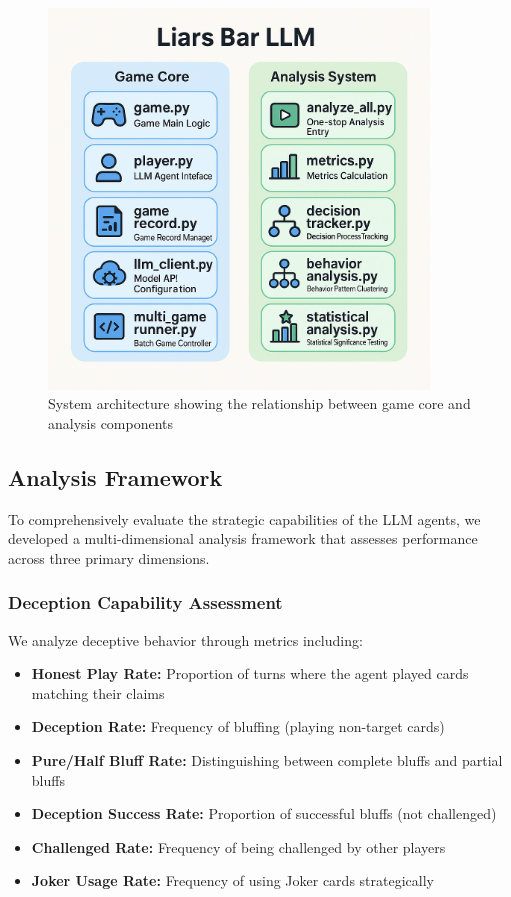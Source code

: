 \documentclass{article}
\begin{document}
\begin{figure}[H]
    \centering
    \includegraphics[width=0.9\textwidth]{figures/project_structure.png}
    \caption{System architecture showing the relationship between game core and analysis components}
    \label{fig:system_architecture}
\end{figure}

\subsection{Analysis Framework}
To comprehensively evaluate the strategic capabilities of the LLM agents, we developed a multi-dimensional analysis framework that assesses performance across three primary dimensions.

\subsubsection{Deception Capability Assessment}
We analyze deceptive behavior through metrics including:
\begin{itemize}
    \item \textbf{Honest Play Rate:} Proportion of turns where the agent played cards matching their claims
    \item \textbf{Deception Rate:} Frequency of bluffing (playing non-target cards)
    \item \textbf{Pure/Half Bluff Rate:} Distinguishing between complete bluffs and partial bluffs
    \item \textbf{Deception Success Rate:} Proportion of successful bluffs (not challenged)
    \item \textbf{Challenged Rate:} Frequency of being challenged by other players
    \item \textbf{Joker Usage Rate:} Frequency of using Joker cards strategically
\end{itemize}
\end{document}
